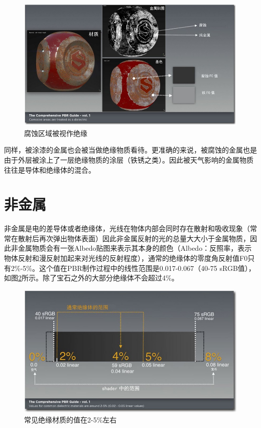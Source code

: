 \begin{figure}[ht]
    \centering
	\includegraphics[width=\textwidth]{images/chap1_13.jpg}
	\caption{腐蚀区域被视作绝缘}
    \label{fig:chap1_13}
\end{figure}

同样，被涂漆的金属也会被当做绝缘物质看待。更准确的来说，被腐蚀的金属也是由于外层被涂上了一层绝缘物质的涂层（铁锈之类）。因此被天气影响的金属物质往往是导体和绝缘体的混合。

\section{非金属}

非金属是电的差导体或者绝缘体，光线在物体内部会同时存在散射和吸收现象（常常在散射后再次弹出物体表面）因此非金属反射的光的总量大大小于金属物质，因此非金属物质会有一张Albedo贴图来表示其本身的颜色（Albedo：反照率，表示物体反射和漫反射加起来对光线的反射程度），通常的绝缘体的零度角反射值F0只有2\%-5\%。这个值在PBR制作过程中的线性范围是0.017-0.067（40-75 sRGB值），如图\ref{fig:chap1_14}所示。除了宝石之外的大部分绝缘体不会超过4\%。

\begin{figure}[ht]
    \centering
	\includegraphics[width=\textwidth]{images/chap1_14.jpg}
	\caption{常见绝缘材质的值在2-5\%左右}
    \label{fig:chap1_14}
\end{figure}


